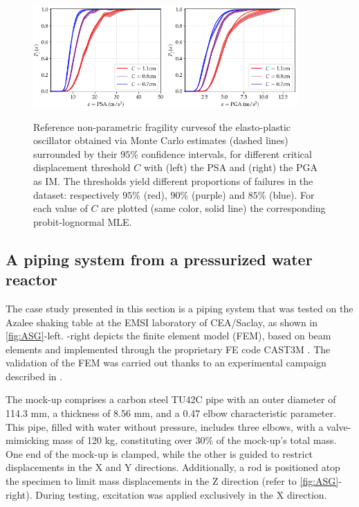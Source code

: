     \begin{figure}[h]
        \centering
        \includegraphics[width=5cm]{figures/intro-frags/oscill/refs_PSA.pdf}
        \includegraphics[width=5cm]{figures/intro-frags/oscill/refs_PGA.pdf}
        \caption{{Reference non-parametric fragility curvesof the elasto-plastic oscillator obtained via Monte Carlo estimates (dashed lines) surrounded by their $95\%$ confidence intervals, for different critical displacement threshold $C$ with (left) the PSA and (right) the PGA as IM.} The thresholds yield different proportions of failures in the dataset: respectively $95\%$ (red), $90\%$ (purple) and $85\%$ (blue).
        For each value of $C$ are plotted (same color, solid line) the corresponding probit-lognormal MLE.}
        \label{fig:intro-frags:oscillrefs}
    \end{figure}


    
    \subsection{A piping system from a pressurized water reactor}\label{sec:intro-frags:piping}

    {The case study presented in this section is a piping system that was tested on the Azalee shaking table at the EMSI laboratory of CEA/Saclay, as shown in \cref{fig:ASG}-left. -right depicts the finite element model (FEM), based on beam elements and implemented through the proprietary FE code CAST3M \citep{cea_cast3m_2019}. The validation of the FEM was carried out thanks to an experimental campaign described in \cite{touboul_seismic_1999}.}

    The mock-up comprises a carbon steel TU42C pipe with an outer diameter of 114.3 mm, a thickness of 8.56 mm, and a 0.47 elbow characteristic parameter. This pipe, filled with water without pressure, includes three elbows, with a valve-mimicking mass of 120 kg, constituting over 30\% of the mock-up's total mass. One end of the mock-up is clamped, while the other is guided to restrict displacements in the X and Y directions. Additionally, a rod is positioned atop the specimen to limit mass displacements in the Z direction (refer to \cref{fig:ASG}-right). During testing, excitation was applied exclusively in the X direction.



